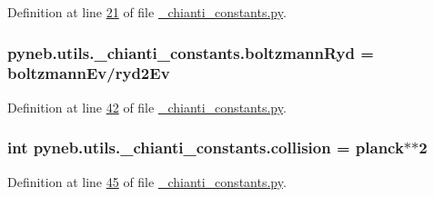 Definition at line \hyperlink{__chianti__constants_8py_source_l00021}{21} of file \hyperlink{__chianti__constants_8py_source}{\-\_\-chianti\-\_\-constants.\-py}.

\hypertarget{namespacepyneb_1_1utils_1_1__chianti__constants_a5f93fd86cb8c071266138f93ee209d00}{
\subsubsection[{boltzmann\-Ryd}]{\setlength{\rightskip}{0pt plus 5cm}pyneb.\-utils.\-\_\-chianti\-\_\-constants.\-boltzmann\-Ryd = {\bf boltzmann\-Ev}/{\bf ryd2\-Ev}}}\label{namespacepyneb_1_1utils_1_1__chianti__constants_a5f93fd86cb8c071266138f93ee209d00}


Definition at line \hyperlink{__chianti__constants_8py_source_l00042}{42} of file \hyperlink{__chianti__constants_8py_source}{\-\_\-chianti\-\_\-constants.\-py}.

\hypertarget{namespacepyneb_1_1utils_1_1__chianti__constants_a66316d73d0acee3da0950278c48f8060}{
\subsubsection[{collision}]{\setlength{\rightskip}{0pt plus 5cm}int pyneb.\-utils.\-\_\-chianti\-\_\-constants.\-collision = {\bf planck}$\ast$$\ast$2}}\label{namespacepyneb_1_1utils_1_1__chianti__constants_a66316d73d0acee3da0950278c48f8060}


Definition at line \hyperlink{__chianti__constants_8py_source_l00045}{45} of file \hyperlink{__chianti__constants_8py_source}{\-\_\-chianti\-\_\-constants.\-py}.


